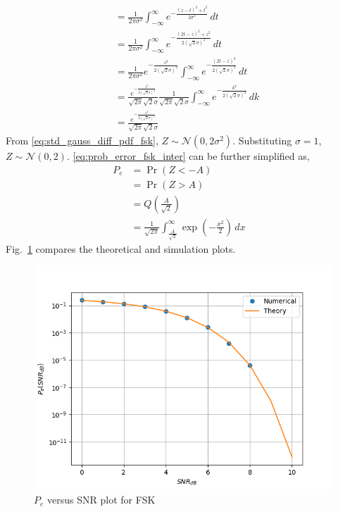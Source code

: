 \documentclass[journal,10pt,twocolumn]{article}
\newcommand\figref{Fig.~\ref}
\providecommand{\pr}[1]{\ensuremath{\Pr\left(#1\right)}}
\providecommand{\qfunc}[1]{\ensuremath{Q\left(#1\right)}}
\providecommand{\gauss}[2]{\mathcal{N}\ensuremath{\left(#1,#2\right)}}
\begin{document}
\begin{enumerate}
\begin{align}
	&= \frac{1}{2\pi\sigma^2}\int_{-\infty}^{\infty} e^{-\frac{(z-t)^2+t^2}{2\sigma^2}}  \,dt\\\nonumber
	&= \frac{1}{2\pi\sigma^2}\int_{-\infty}^{\infty} e^{-\frac{(2t-z)^2+z^2}{2(\sqrt{2}\sigma)^2}}  \,dt\\\nonumber
	&= \frac{1}{2\pi\sigma^2}e^{-\frac{z^2}{2(\sqrt{2}\sigma)^2}}\int_{-\infty}^{\infty} e^{-\frac{(2t-z)^2}{2(\sqrt{2}\sigma)^2}}  \,dt\\\nonumber
	&= \frac{e^{-\frac{z^2}{2(\sqrt{2}\sigma)^2}}}{\sqrt{2\pi}\sqrt{2}\sigma} \frac{1}{\sqrt{2\pi}\sqrt{2}\sigma}\int_{-\infty}^{\infty} e^{-\frac{k^2}{2(\sqrt{2}\sigma)^2}}  \,dk\\
	\label{eq:std_gauss_diff_pdf_fsk}
	&= \frac{e^{-\frac{z^2}{2(\sqrt{2}\sigma)^2}}}{\sqrt{2\pi}\sqrt{2}\sigma}
\end{align}
From \eqref{eq:std_gauss_diff_pdf_fsk}, $Z \sim \gauss{0}{2\sigma^2}$. Substituting $\sigma=1$, $Z \sim \gauss{0}{2}$. %
\eqref{eq:prob_error_fsk_inter} can be further simplified as,
\begin{align*}
	P_e &= \pr{Z < -A}&\\
	&= \pr{Z > A}&\\
	&= \qfunc{\frac{A}{\sqrt{2}}}&\\
	&= \frac{1}{\sqrt{2\pi}}\int_{\frac{A}{\sqrt{2}}}^{\infty} \exp\left(-\frac{x^2}{2}\right)  \,dx 
\end{align*}
\figref{fig:biv_pe_snr} compares the theoretical and simulation plots.

\begin{figure}[H]
\centering
\includegraphics[width=\columnwidth]{./chapters/ch5/figs/ch5_snr.png}
\caption{$P_e$ versus SNR plot for FSK}
\label{fig:biv_pe_snr}
\end{figure}
%
\end{enumerate}

\end{document}
